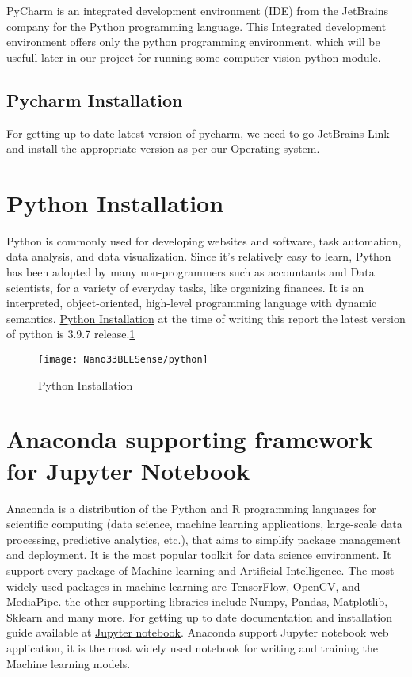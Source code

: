 PyCharm is an integrated development environment (IDE) from the JetBrains company for the Python programming language. This Integrated development environment offers only the python programming environment, which will be usefull later in our project for running some computer vision python module.


\subsection{Pycharm Installation}

For getting up to date latest version of pycharm, we need to go \href{https://www.jetbrains.com/pycharm/download/#section=windows}{JetBrains-Link} and install the appropriate version as per our Operating system. 

\section{Python Installation}

Python is commonly used for developing websites and software, task automation, data analysis, and data visualization. Since it's relatively easy to learn, Python has been adopted by many non-programmers such as accountants and Data scientists, for a variety of everyday tasks, like organizing finances. It is an interpreted, object-oriented, high-level programming language with dynamic semantics. \href{https://www.python.org/downloads/}{Python Installation} at the time of writing this report the latest version of python is 3.9.7 release.\ref{Python Installation}

\begin{figure}[h]
	\centering
	\texttt{[image: Nano33BLESense/python]}
	\caption{Python Installation}
	\label{Python Installation}
\end{figure}

\section{Anaconda supporting framework for Jupyter Notebook}

Anaconda is a distribution of the Python and R programming languages for scientific computing (data science, machine learning applications, large-scale data processing, predictive analytics, etc.), that aims to simplify package management and deployment. It is the most popular toolkit for data science environment. It support every package of Machine learning and Artificial Intelligence. The most widely used packages in machine learning are TensorFlow, OpenCV, and MediaPipe. the other supporting libraries include Numpy, Pandas, Matplotlib, Sklearn and many more. For getting up to date documentation and installation guide available at \href{https://www.anaconda.com/products/individual}{Jupyter notebook}. Anaconda support Jupyter notebook web application, it is the most widely used notebook for writing and training the Machine learning models.


